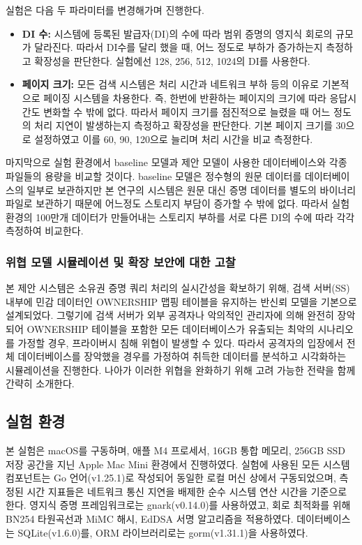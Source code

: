 \bigskip

실험은 다음 두 파라미터를 변경해가며 진행한다. 

\begin{itemize}
    \item \textbf{DI 수:} 시스템에 등록된 발급자(DI)의 수에 따라 범위 증명의 영지식 회로의 규모가 달라진다. 따라서 DI수를 달리 했을 때, 어느 정도로 부하가 증가하는지 측정하고 확장성을 판단한다. 실험에선 128, 256, 512, 1024의 DI를 사용한다.
    \item \textbf{페이지 크기:} 모든 검색 시스템은 처리 시간과 네트워크 부하 등의 이유로 기본적으로 페이징 시스템을 차용한다. 즉, 한번에 반환하는 페이지의 크기에 따라 응답시간도 변화할 수 밖에 없다. 따라서 페이지 크기를 점진적으로 늘렸을 때 어느 정도의 처리 지연이 발생하는지 측정하고 확장성을 판단한다. 기본 페이지 크기를 30으로 설정하였고 이를 60, 90, 120으로 늘리며 처리 시간을 비교 측정한다.
\end{itemize}

마지막으로 실험 환경에서 baseline 모델과 제안 모델이 사용한 데이터베이스와 각종 파일들의 용량을 비교할 것이다. baseline 모델은 정수형의 원문 데이터를 데이터베이스의 일부로 보관하지만 본 연구의 시스템은 원문 대신 증명 데이터를 별도의 바이너리 파일로 보관하기 때문에 어느정도 스토리지 부담이 증가할 수 밖에 없다. 따라서 실험 환경의 100만개 데이터가 만들어내는 스토리지 부하를 서로 다른 DI의 수에 따라 각각 측정하여 비교한다.

\subsubsection{위협 모델 시뮬레이션 및 확장 보안에 대한 고찰}

본 제안 시스템은 소유권 증명 쿼리 처리의 실시간성을 확보하기 위해, 검색 서버(SS) 내부에 민감 데이터인 OWNERSHIP 맵핑 테이블을 유지하는 반신뢰 모델을 기본으로 설계되었다. 그렇기에 검색 서버가 외부 공격자나 악의적인 관리자에 의해 완전히 장악되어 OWNERSHIP 테이블을 포함한 모든 데이터베이스가 유출되는 최악의 시나리오를 가정할 경우, 프라이버시 침해 위협이 발생할 수 있다. 따라서 공격자의 입장에서 전체 데이터베이스를 장악했을 경우를 가정하여 취득한 데이터를 분석하고 시각화하는 시뮬레이션을 진행한다. 나아가 이러한 위협을 완화하기 위해 고려 가능한 전략을 함께 간략히 소개한다.

\subsection{실험 환경}

본 실험은 macOS를 구동하며, 애플 M4 프로세서, 16GB 통합 메모리, 256GB SSD 저장 공간을 지닌 Apple Mac Mini 환경에서 진행하였다. 실험에 사용된 모든 시스템 컴포넌트는 Go 언어(v1.25.1)로 작성되어 동일한 로컬 머신 상에서 구동되었으며, 측정된 시간 지표들은 네트워크 통신 지연을 배제한 순수 시스템 연산 시간을 기준으로 한다. 영지식 증명 프레임워크로는 gnark(v0.14.0)를 사용하였고, 회로 최적화를 위해 BN254 타원곡선과 MiMC 해시, EdDSA 서명 알고리즘을 적용하였다. 데이터베이스는 SQLite(v1.6.0)를, ORM 라이브러리로는 gorm(v1.31.1)을 사용하였다.

